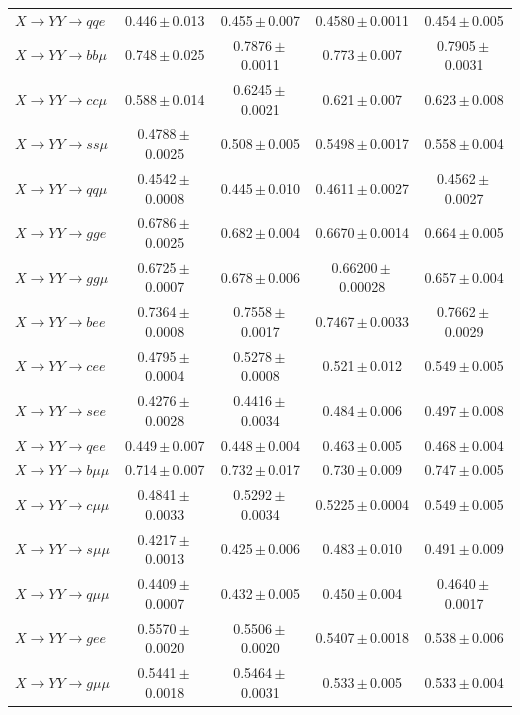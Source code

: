 \documentclass[12pt]{article}   %
\begin{document}
\begin{landscape}
{\begin{longtable}{@{\extracolsep{\fill}}lcccc@{}}
$X\to YY\to qqe$ & 0.446\,$\pm$\,0.013 & 0.455\,$\pm$\,0.007 & 0.4580\,$\pm$\,0.0011 & 0.454\,$\pm$\,0.005 \\
$X\to YY\to bb\mu$ & 0.748\,$\pm$\,0.025 & 0.7876\,$\pm$\,0.0011 & 0.773\,$\pm$\,0.007 & 0.7905\,$\pm$\,0.0031 \\
$X\to YY\to cc\mu$ & 0.588\,$\pm$\,0.014 & 0.6245\,$\pm$\,0.0021 & 0.621\,$\pm$\,0.007 & 0.623\,$\pm$\,0.008 \\
$X\to YY\to ss\mu$ & 0.4788\,$\pm$\,0.0025 & 0.508\,$\pm$\,0.005 & 0.5498\,$\pm$\,0.0017 & 0.558\,$\pm$\,0.004 \\
$X\to YY\to qq\mu$ & 0.4542\,$\pm$\,0.0008 & 0.445\,$\pm$\,0.010 & 0.4611\,$\pm$\,0.0027 & 0.4562\,$\pm$\,0.0027 \\
$X\to YY\to gge$ & 0.6786\,$\pm$\,0.0025 & 0.682\,$\pm$\,0.004 & 0.6670\,$\pm$\,0.0014 & 0.664\,$\pm$\,0.005 \\
$X\to YY\to gg\mu$ & 0.6725\,$\pm$\,0.0007 & 0.678\,$\pm$\,0.006 & 0.66200\,$\pm$\,0.00028 & 0.657\,$\pm$\,0.004 \\
\midrule
$X\to YY\to bee$ & 0.7364\,$\pm$\,0.0008 & 0.7558\,$\pm$\,0.0017 & 0.7467\,$\pm$\,0.0033 & 0.7662\,$\pm$\,0.0029 \\
$X\to YY\to cee$ & 0.4795\,$\pm$\,0.0004 & 0.5278\,$\pm$\,0.0008 & 0.521\,$\pm$\,0.012 & 0.549\,$\pm$\,0.005 \\
$X\to YY\to see$ & 0.4276\,$\pm$\,0.0028 & 0.4416\,$\pm$\,0.0034 & 0.484\,$\pm$\,0.006 & 0.497\,$\pm$\,0.008 \\
$X\to YY\to qee$ & 0.449\,$\pm$\,0.007 & 0.448\,$\pm$\,0.004 & 0.463\,$\pm$\,0.005 & 0.468\,$\pm$\,0.004 \\
$X\to YY\to b\mu\mu$ & 0.714\,$\pm$\,0.007 & 0.732\,$\pm$\,0.017 & 0.730\,$\pm$\,0.009 & 0.747\,$\pm$\,0.005 \\
$X\to YY\to c\mu\mu$ & 0.4841\,$\pm$\,0.0033 & 0.5292\,$\pm$\,0.0034 & 0.5225\,$\pm$\,0.0004 & 0.549\,$\pm$\,0.005 \\
$X\to YY\to s\mu\mu$ & 0.4217\,$\pm$\,0.0013 & 0.425\,$\pm$\,0.006 & 0.483\,$\pm$\,0.010 & 0.491\,$\pm$\,0.009 \\
$X\to YY\to q\mu\mu$ & 0.4409\,$\pm$\,0.0007 & 0.432\,$\pm$\,0.005 & 0.450\,$\pm$\,0.004 & 0.4640\,$\pm$\,0.0017 \\
$X\to YY\to gee$ & 0.5570\,$\pm$\,0.0020 & 0.5506\,$\pm$\,0.0020 & 0.5407\,$\pm$\,0.0018 & 0.538\,$\pm$\,0.006 \\
$X\to YY\to g\mu\mu$ & 0.5441\,$\pm$\,0.0018 & 0.5464\,$\pm$\,0.0031 & 0.533\,$\pm$\,0.005 & 0.533\,$\pm$\,0.004 \\

\end{longtable}}
\end{landscape}
\end{document}
